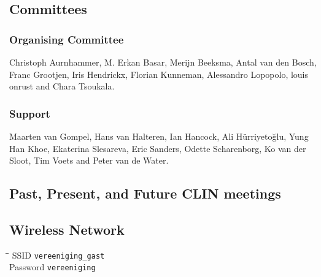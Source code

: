 \subsection*{Committees}


\subsubsection*{Organising Committee}
Christoph Aurnhammer, M. Erkan Basar, Merijn Beeksma, Antal van den Bosch, Franc Grootjen, Iris Hendrickx, Florian Kunneman, Alessandro Lopopolo, louis onrust and Chara Tsoukala.

\subsubsection*{Support}
Maarten van Gompel, Hans van Halteren, Ian Hancock, Ali Hürriyetoğlu, Yung Han Khoe, Ekaterina Slesareva, Eric Sanders, Odette Scharenborg, Ko van der Sloot, Tim Voets and Peter van de Water.


\subsection*{Past, Present, and Future CLIN meetings}

\subsection*{Wireless Network}
\begin{tabbing}
\phantom{Password } \=  \= \kill %
SSID     \> \texttt{vereeniging\_gast} \\
Password \> \texttt{vereeniging} \\
\end{tabbing}


